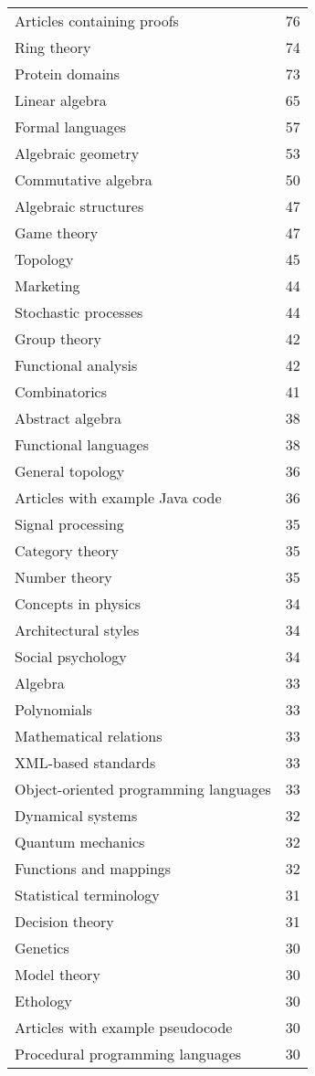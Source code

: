 \begin{appendices}
\begin{longtable} {|| p{20em} | p{5em} ||}
 Articles containing proofs	&	76	\\
Ring theory	&	74	\\
Protein domains	&	73	\\
Linear algebra	&	65	\\
Formal languages	&	57	\\
Algebraic geometry	&	53	\\
Commutative algebra	&	50	\\
Algebraic structures	&	47	\\
Game theory	&	47	\\
Topology	&	45	\\
Marketing	&	44	\\
Stochastic processes	&	44	\\
Group theory	&	42	\\
Functional analysis	&	42	\\
Combinatorics	&	41	\\
Abstract algebra	&	38	\\
Functional languages	&	38	\\
General topology	&	36	\\
Articles with example Java code	&	36	\\
Signal processing	&	35	\\
Category theory	&	35	\\
Number theory	&	35	\\
Concepts in physics	&	34	\\
Architectural styles	&	34	\\
Social psychology	&	34	\\
Algebra	&	33	\\
Polynomials	&	33	\\
Mathematical relations	&	33	\\
XML-based standards	&	33	\\
Object-oriented programming languages	&	33	\\
Dynamical systems	&	32	\\
Quantum mechanics	&	32	\\
Functions and mappings	&	32	\\
Statistical terminology	&	31	\\
Decision theory	&	31	\\
Genetics	&	30	\\
Model theory	&	30	\\
Ethology	&	30	\\
Articles with example pseudocode	&	30	\\
Procedural programming languages	&	30	\\

\end{longtable}
\end{appendices}
